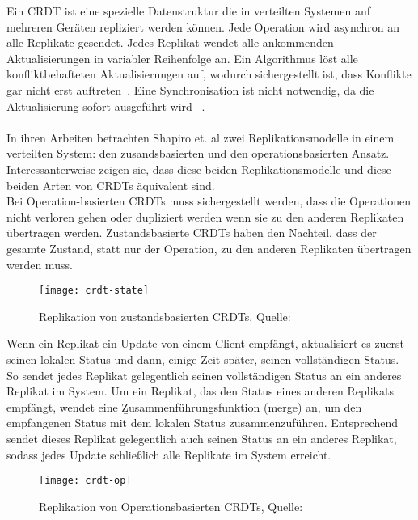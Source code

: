 %
%
Ein \gls{CRDT} ist eine spezielle Datenstruktur die in verteilten Systemen auf mehreren Geräten repliziert werden können. Jede Operation wird asynchron an alle Replikate gesendet. Jedes Replikat wendet alle ankommenden Aktualisierungen in variabler Reihenfolge an. Ein Algorithmus löst alle konfliktbehafteten Aktualisierungen auf, wodurch sichergestellt ist, dass Konflikte gar nicht erst auftreten~\cite{crdt_shapiro}. Eine Synchronisation ist nicht notwendig, da die Aktualisierung sofort ausgeführt wird ~\cite{crdt_shapiro2}.\\\\
%
In ihren Arbeiten betrachten Shapiro et. al zwei Replikationsmodelle in einem verteilten System: den zusandsbasierten und den operationsbasierten Ansatz.
Interessanterweise zeigen sie, dass diese beiden Replikationsmodelle und diese beiden Arten von CRDTs äquivalent sind.\\
Bei Operation-basierten \glspl{CRDT} muss sichergestellt werden, dass die Operationen nicht verloren gehen oder dupliziert werden wenn sie zu den anderen Replikaten übertragen werden.
Zustandsbasierte \glspl{CRDT} haben den Nachteil, dass der gesamte Zustand, statt nur der Operation, zu den anderen Replikaten übertragen werden muss.
%
%

\begin{figure}[H]
  \centering
  \texttt{[image: crdt-state]}
  \grayRule
  \caption[Replikation von zustandsbasierten \glspl{CRDT}]{Replikation von zustandsbasierten \glspl{CRDT}, Quelle: ~\cite{crdt_shapiro2}}
  \label{fig:crdt-state}
\end{figure}

Wenn ein Replikat ein Update von einem Client empfängt, aktualisiert es zuerst seinen lokalen Status und dann, einige Zeit später, seinen \b{vollständigen Status}.
So sendet jedes Replikat gelegentlich seinen vollständigen Status an ein anderes Replikat im System.
Um ein Replikat, das den Status eines anderen Replikats empfängt, wendet eine \b{Zusammenführungsfunktion} (merge) an, um den empfangenen Status mit dem lokalen Status zusammenzuführen.
Entsprechend sendet dieses Replikat gelegentlich auch seinen Status an ein anderes Replikat, sodass jedes Update schließlich alle Replikate im System erreicht.
%
%
\begin{figure}[H]
  \centering
  \texttt{[image: crdt-op]}
  \grayRule
  \caption[Replikation von Operationsbasierten \gls{CRDT}]{Replikation von Operationsbasierten \glspl{CRDT}, Quelle: ~\cite{crdt_shapiro2}}
  \label{fig:crdt-op}
\end{figure}

